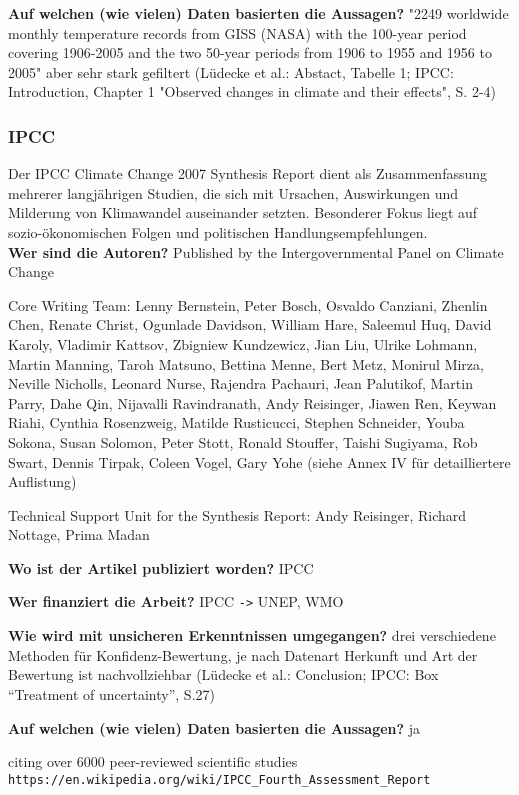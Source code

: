 \documentclass{article}
\begin{document}
\textbf{Auf welchen (wie vielen) Daten basierten die Aussagen?}
"2249 worldwide monthly temperature records from GISS (NASA) with the 100-year
period covering 1906-2005 and the two 50-year periods from 1906 to 1955
and 1956 to 2005" aber sehr stark gefiltert
(Lüdecke et al.: Abstact, Tabelle 1; IPCC: Introduction, Chapter 1 "Observed
changes in climate and their effects", S. 2-4)


\subsubsection*{IPCC}
Der IPCC Climate Change 2007 Synthesis Report dient als Zusammenfassung mehrerer langjährigen Studien, die sich mit Ursachen, Auswirkungen und Milderung von Klimawandel auseinander setzten.
Besonderer Fokus liegt auf sozio-ökonomischen Folgen und politischen Handlungsempfehlungen.
\\

\textbf{Wer sind die Autoren?}
Published by the Intergovernmental Panel on Climate Change

Core Writing Team:
Lenny Bernstein, Peter Bosch, Osvaldo Canziani, Zhenlin Chen, Renate Christ, Ogunlade Davidson,
William Hare, Saleemul Huq, David Karoly, Vladimir Kattsov, Zbigniew Kundzewicz, Jian Liu, Ulrike
Lohmann, Martin Manning, Taroh Matsuno, Bettina Menne, Bert Metz, Monirul Mirza, Neville Nicholls,
Leonard Nurse, Rajendra Pachauri, Jean Palutikof, Martin Parry, Dahe Qin, Nijavalli Ravindranath,
Andy Reisinger, Jiawen Ren, Keywan Riahi, Cynthia Rosenzweig, Matilde Rusticucci, Stephen Schneider, Youba Sokona, Susan Solomon, Peter Stott, Ronald Stouffer, Taishi Sugiyama, Rob Swart,
Dennis Tirpak, Coleen Vogel, Gary Yohe (siehe Annex IV für detailliertere Auflistung)

Technical Support Unit for the Synthesis Report:
Andy Reisinger, Richard Nottage, Prima Madan

\textbf{Wo ist der Artikel publiziert worden?}
IPCC

\textbf{Wer finanziert die Arbeit?}
IPCC \verb|->| UNEP, WMO

\textbf{Wie wird mit unsicheren Erkenntnissen umgegangen?}
drei verschiedene Methoden für Konfidenz-Bewertung, je nach Datenart
Herkunft und Art der Bewertung ist nachvollziehbar
(Lüdecke et al.: Conclusion; IPCC: Box “Treatment of uncertainty”, S.27)

\textbf{Auf welchen (wie vielen) Daten basierten die Aussagen?}
ja

citing over 6000 peer-reviewed scientific studies 
\\\verb|https://en.wikipedia.org/wiki/IPCC_Fourth_Assessment_Report|
\end{document}
